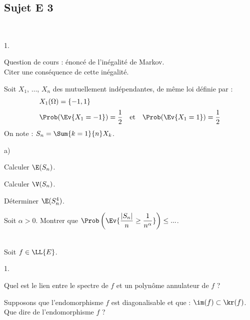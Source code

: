 \documentclass[11pt]{article}%
\begin{document}
\newpage



\subsection*{Sujet E 3}

\begin{exerciceAP}~
  \begin{noliste}{1.}
    \item Question de cours : énoncé de l'inégalité de Markov.\\
    Citer une conséquence de cette inégalité.
    
    \item Soit $X_1$, $\ldots$, $X_n$ des \var mutuellement 
    indépendantes, de même loi définie par :
    \[
      \begin{array}{l}
        X_1(\Omega) = \{-1,1\} \\[.2cm]
        \Prob(\Ev{X_1 = -1}) = \dfrac{1}{2} \quad \text{et} \quad
        \Prob(\Ev{X_1=1}) = \dfrac{1}{2}
      \end{array}
    \]
    On note : $S_n = \Sum{k=1}{n} X_k$.
    \begin{noliste}{a)}
      \item Calculer $\E(S_n)$.
      
      \item Calculer $\V(S_n)$.
    \end{noliste}
    
    \item Déterminer $\E(S_n^4)$.
    
    \item Soit $\alpha >0$.
    Montrer que $\Prob\left(\Ev{ \dfrac{\vert S_n \vert}{n} \geq 
    \dfrac{1}{n^\alpha}}\right) \leq ...$.
  \end{noliste}
\end{exerciceAP}




\begin{exerciceSP}~\\
  Soit $f \in \LL{E}$.
  \begin{noliste}{1.}
    \item Quel est le lien entre le spectre de $f$
    et un polynôme annulateur de $f$ ?
    
    \item Supposons que l'endomorphisme $f$ est diagonalisable et 
    que : $\im(f) \subset \kr(f)$.\\
    Que dire de l'endomorphisme $f$ ?
  \end{noliste}
\end{exerciceSP}
\end{document}
